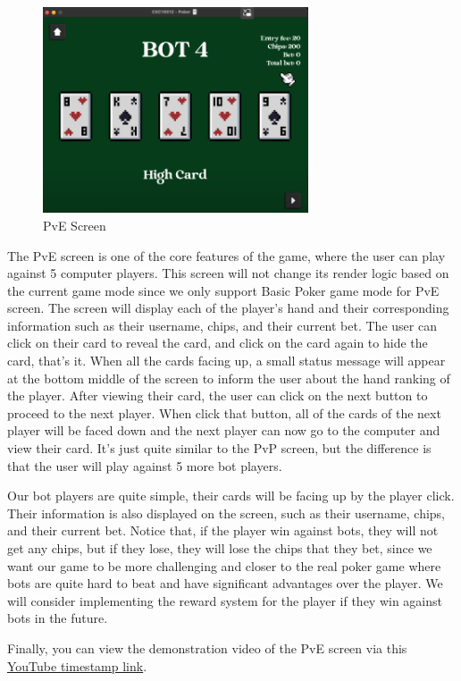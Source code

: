 \begin{figure}[H]
    \centering
    \includegraphics[width=0.7\textwidth]{figures/pve_screen.png}
    \caption{PvE Screen}
    \label{fig:pve-screen}
\end{figure}

\hspace{1cm} The PvE screen is one of the core features of the game, where the user can play against 5 computer players. This screen will not change its render logic based on the current game mode since we only support Basic Poker game mode for PvE screen. The screen will display each of the player's hand and their corresponding information such as their username, chips, and their current bet. The user can click on their card to reveal the card, and click on the card again to hide the card, that's it. When all the cards facing up, a small status message will appear at the bottom middle of the screen to inform the user about the hand ranking of the player. After viewing their card, the user can click on the next button to proceed to the next player. When click that button, all of the cards of the next player will be faced down and the next player can now go to the computer and view their card. It's just quite similar to the PvP screen, but the difference is that the user will play against 5 more bot players.

\vspace{0.5cm}

\hspace{1cm} Our bot players are quite simple, their cards will be facing up by the player click. Their information is also displayed on the screen, such as their username, chips, and their current bet. Notice that, if the player win against bots, they will not get any chips, but if they lose, they will lose the chips that they bet, since we want our game to be more challenging and closer to the real poker game where bots are quite hard to beat and have significant advantages over the player. We will consider implementing the reward system for the player if they win against bots in the future.

\vspace{0.5cm}

\hspace{1cm} Finally, you can view the demonstration video of the PvE screen via this \href{https://youtu.be/OA0v6xG21N4?t=210}{YouTube timestamp link}.

